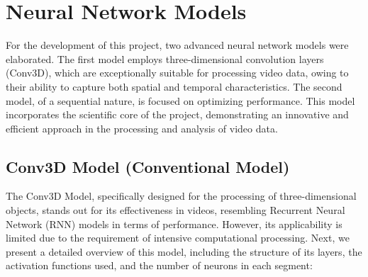 \documentclass{article}
\begin{document}



\section{Neural Network Models}
For the development of this project, two advanced neural network models were elaborated. The first model employs three-dimensional convolution layers (Conv3D), which are exceptionally suitable for processing video data, owing to their ability to capture both spatial and temporal characteristics. The second model, of a sequential nature, is focused on optimizing performance. This model incorporates the scientific core of the project, demonstrating an innovative and efficient approach in the processing and analysis of video data.

\subsection{Conv3D Model (Conventional Model)}
The Conv3D Model, specifically designed for the processing of three-dimensional objects, stands out for its effectiveness in videos, resembling Recurrent Neural Network (RNN) models in terms of performance. However, its applicability is limited due to the requirement of intensive computational processing. Next, we present a detailed overview of this model, including the structure of its layers, the activation functions used, and the number of neurons in each segment:
\end{document}
